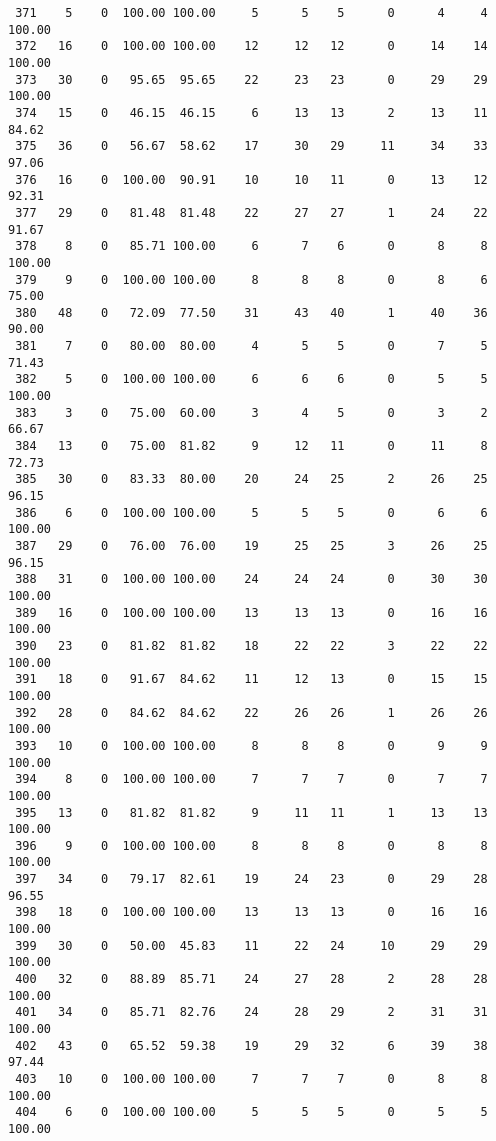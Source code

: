 \begin{verbatim}
 371    5    0  100.00 100.00     5      5    5      0      4     4   100.00
 372   16    0  100.00 100.00    12     12   12      0     14    14   100.00
 373   30    0   95.65  95.65    22     23   23      0     29    29   100.00
 374   15    0   46.15  46.15     6     13   13      2     13    11    84.62
 375   36    0   56.67  58.62    17     30   29     11     34    33    97.06
 376   16    0  100.00  90.91    10     10   11      0     13    12    92.31
 377   29    0   81.48  81.48    22     27   27      1     24    22    91.67
 378    8    0   85.71 100.00     6      7    6      0      8     8   100.00
 379    9    0  100.00 100.00     8      8    8      0      8     6    75.00
 380   48    0   72.09  77.50    31     43   40      1     40    36    90.00
 381    7    0   80.00  80.00     4      5    5      0      7     5    71.43
 382    5    0  100.00 100.00     6      6    6      0      5     5   100.00
 383    3    0   75.00  60.00     3      4    5      0      3     2    66.67
 384   13    0   75.00  81.82     9     12   11      0     11     8    72.73
 385   30    0   83.33  80.00    20     24   25      2     26    25    96.15
 386    6    0  100.00 100.00     5      5    5      0      6     6   100.00
 387   29    0   76.00  76.00    19     25   25      3     26    25    96.15
 388   31    0  100.00 100.00    24     24   24      0     30    30   100.00
 389   16    0  100.00 100.00    13     13   13      0     16    16   100.00
 390   23    0   81.82  81.82    18     22   22      3     22    22   100.00
 391   18    0   91.67  84.62    11     12   13      0     15    15   100.00
 392   28    0   84.62  84.62    22     26   26      1     26    26   100.00
 393   10    0  100.00 100.00     8      8    8      0      9     9   100.00
 394    8    0  100.00 100.00     7      7    7      0      7     7   100.00
 395   13    0   81.82  81.82     9     11   11      1     13    13   100.00
 396    9    0  100.00 100.00     8      8    8      0      8     8   100.00
 397   34    0   79.17  82.61    19     24   23      0     29    28    96.55
 398   18    0  100.00 100.00    13     13   13      0     16    16   100.00
 399   30    0   50.00  45.83    11     22   24     10     29    29   100.00
 400   32    0   88.89  85.71    24     27   28      2     28    28   100.00
 401   34    0   85.71  82.76    24     28   29      2     31    31   100.00
 402   43    0   65.52  59.38    19     29   32      6     39    38    97.44
 403   10    0  100.00 100.00     7      7    7      0      8     8   100.00
 404    6    0  100.00 100.00     5      5    5      0      5     5   100.00

\end{verbatim}
